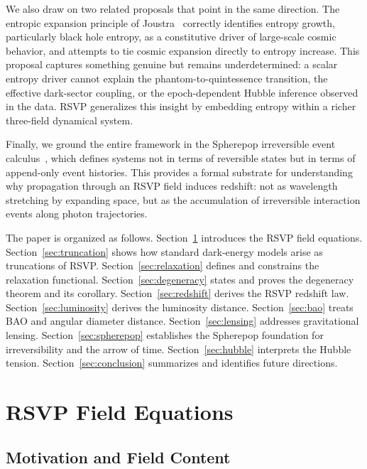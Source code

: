 \documentclass[12pt,a4paper]{article}
\theoremstyle{remark}
\begin{document}
We also draw on two related proposals that point in the same direction. The entropic expansion principle of Joustra~\cite{joustra} correctly identifies entropy growth, particularly black hole entropy, as a constitutive driver of large-scale cosmic behavior, and attempts to tie cosmic expansion directly to entropy increase. This proposal captures something genuine but remains underdetermined: a scalar entropy driver cannot explain the phantom-to-quintessence transition, the effective dark-sector coupling, or the epoch-dependent Hubble inference observed in the data. RSVP generalizes this insight by embedding entropy within a richer three-field dynamical system.

Finally, we ground the entire framework in the Spherepop irreversible event calculus~\cite{spherepop}, which defines systems not in terms of reversible states but in terms of append-only event histories. This provides a formal substrate for understanding why propagation through an RSVP field induces redshift: not as wavelength stretching by expanding space, but as the accumulation of irreversible interaction events along photon trajectories.

The paper is organized as follows. Section~\ref{sec:fields} introduces the RSVP field equations. Section~\ref{sec:truncation} shows how standard dark-energy models arise as truncations of RSVP. Section~\ref{sec:relaxation} defines and constrains the relaxation functional. Section~\ref{sec:degeneracy} states and proves the degeneracy theorem and its corollary. Section~\ref{sec:redshift} derives the RSVP redshift law. Section~\ref{sec:luminosity} derives the luminosity distance. Section~\ref{sec:bao} treats BAO and angular diameter distance. Section~\ref{sec:lensing} addresses gravitational lensing. Section~\ref{sec:spherepop} establishes the Spherepop foundation for irreversibility and the arrow of time. Section~\ref{sec:hubble} interprets the Hubble tension. Section~\ref{sec:conclusion} summarizes and identifies future directions.

\section{RSVP Field Equations}
\label{sec:fields}

\subsection{Motivation and Field Content}
\end{document}
